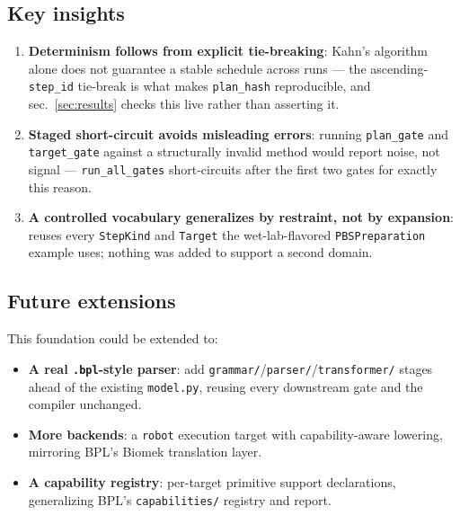 \documentclass[
  english,
]{article}
\providecommand{\tightlist}{%
  \setlength{\itemsep}{0pt}\setlength{\parskip}{0pt}}
\begin{document}
\subsection{Key insights}\label{key-insights}

\begin{enumerate}
\def\labelenumi{\arabic{enumi}.}
\tightlist
\item
  \textbf{Determinism follows from explicit tie-breaking}: Kahn's
  algorithm \citep{kahn1962topological} alone does not guarantee a
  stable schedule across runs --- the ascending-\texttt{step\_id}
  tie-break is what makes \texttt{plan\_hash} reproducible, and
  sec.~\ref{sec:results} checks this live rather than asserting it.
\item
  \textbf{Staged short-circuit avoids misleading errors}: running
  \texttt{plan\_gate} and \texttt{target\_gate} against a structurally
  invalid method would report noise, not signal ---
  \texttt{run\_all\_gates} short-circuits after the first two gates for
  exactly this reason.
\item
  \textbf{A controlled vocabulary generalizes by restraint, not by
  expansion}:  reuses every
  \texttt{StepKind} and \texttt{Target} the wet-lab-flavored
  \texttt{PBSPreparation} example uses; nothing was added to support a
  second domain.
\end{enumerate}

\subsection{Future extensions}\label{future-extensions}

This foundation could be extended to:

\begin{itemize}
\tightlist
\item
  \textbf{A real \texttt{.bpl}-style parser}: add
  \texttt{grammar/}/\texttt{parser/}/\texttt{transformer/} stages ahead
  of the existing \texttt{model.py}, reusing every downstream gate and
  the compiler unchanged.
\item
  \textbf{More backends}: a \texttt{robot} execution target with
  capability-aware lowering, mirroring BPL's Biomek translation layer.
\item
  \textbf{A capability registry}: per-target primitive support
  declarations, generalizing BPL's \texttt{capabilities/} registry and
   report.
\end{itemize}
\end{document}
